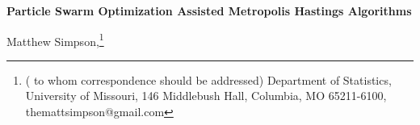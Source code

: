 \documentclass[12pt]{article}
\begin{document}
\thispagestyle{empty} \baselineskip=28pt

\thispagestyle{empty} \baselineskip=28pt

%
\begin{center}
{\LARGE{\bf Particle Swarm Optimization Assisted Metropolis Hastings Algorithms}}
\end{center}


\baselineskip=12pt


\vskip 2mm
\begin{center}
Matthew Simpson,\footnote{(\baselineskip=10pt to whom correspondence should be addressed)
Department of Statistics, University of Missouri,
146 Middlebush Hall, Columbia, MO 65211-6100, themattsimpson@gmail.com}
\end{center}
\clearpage\pagebreak\newpage {}

\baselineskip=24pt
\end{document}
